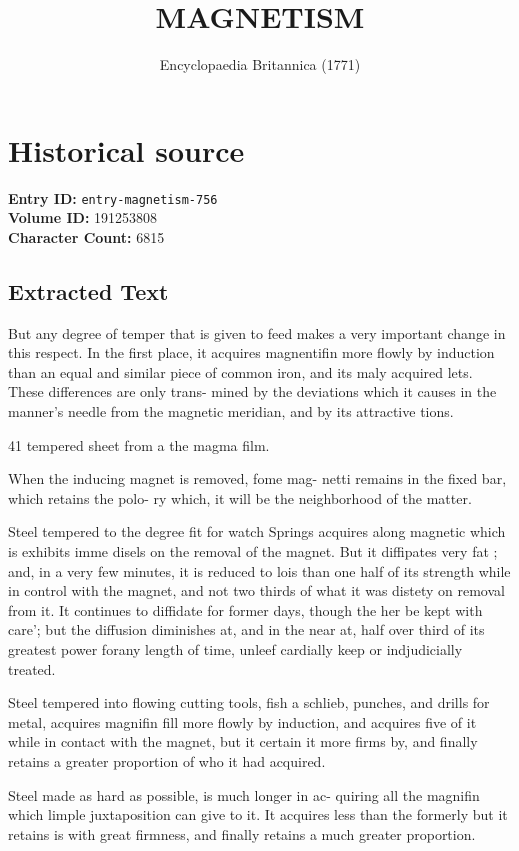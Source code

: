 \documentclass{article}
\title{MAGNETISM}
\date{Encyclopaedia Britannica (1771)}
\begin{document}
\maketitle

\section*{Historical source}
\textbf{Entry ID:} \texttt{entry-magnetism-756} \\
\textbf{Volume ID:} 191253808 \\
\textbf{Character Count:} 6815

\subsection*{Extracted Text}
But any degree of temper that is given to feed makes
a very important change in this respect. In the first
place, it acquires magnentifin more flowly by induction
than an equal and similar piece of common iron, and its
maly acquired lets. These differences are only trans-
mined by the deviations which it causes in the manner’s
needle from the magnetic meridian, and by its attractive
tions.

41 tempered
sheet
from a
the magma
film.

When the inducing magnet is removed, fome mag-
netti remains in the fixed bar, which retains the polo-
ry which, it will be the neighborhood of the matter.

Steel tempered to the degree fit for watch Springs
acquires along magnetic which is exhibits imme
disels on the removal of the magnet. But it diffipates
very fat ; and, in a very few minutes, it is reduced to
lois than one half of its strength while in control with
the magnet, and not two thirds of what it was
distety on removal from it. It continues to diffidate for
former days, though the her be kept with care'; but the
diffusion diminishes at, and in the near at, half over
third of its greatest power forany length of time, unleef
cardially keep or indjudicially treated.

Steel tempered into flowing cutting tools, fish a schlieb,
punches, and drills for metal, acquires magnifin fill
more flowly by induction, and acquires five of it while
in contact with the magnet, but it certain it more firms
by, and finally retains a greater proportion of who it
had acquired.

Steel made as hard as possible, is much longer in ac-
quiring all the magnifin which limple juxtaposition
can give to it. It acquires less than the formerly but it
retains is with great firmness, and finally retains a much
greater proportion.
\end{document}
